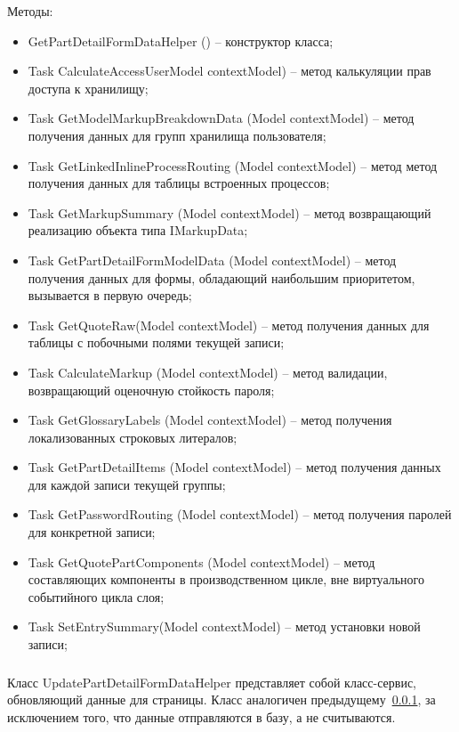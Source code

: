 Методы:
\begin{itemize}
  \item GetPartDetailFormDataHelper () – конструктор класса;
  \item Task CalculateAccessUserModel contextModel) – метод калькуляции прав доступа к хранилищу;
  \item Task GetModelMarkupBreakdownData (Model contextModel) – метод получения данных для групп хранилища пользователя;
  \item Task GetLinkedInlineProcessRouting (Model contextModel) – метод метод получения данных для таблицы встроенных процессов;
  \item Task GetMarkupSummary (Model contextModel) – метод возвращающий реализацию объекта типа IMarkupData;
  \item Task GetPartDetailFormModelData (Model contextModel) – метод получения данных для формы, обладающий наибольшим приоритетом, вызывается в первую очередь;
  \item Task GetQuoteRaw(Model contextModel) – метод получения данных для таблицы с побочными полями текущей записи;
  \item Task CalculateMarkup (Model contextModel) – метод валидации, возвращающий оценочную стойкость пароля;
  \item Task GetGlossaryLabels (Model contextModel) – метод получения локализованных строковых литералов;
  \item Task GetPartDetailItems (Model contextModel) – метод получения данных для каждой записи текущей группы;
  \item Task GetPasswordRouting (Model contextModel) – метод получения паролей для конкретной записи;
  \item Task GetQuotePartComponents (Model contextModel) – метод составляющих компоненты в производственном цикле, вне виртуального событийного цикла слоя;
  \item Task SetEntrySummary(Model contextModel) – метод установки новой записи;
\end{itemize}

\subsubsection{}
\label{sub:arch_and_mod:data_layer:view_part_detail}

Класс UpdatePartDetailFormDataHelper представляет собой класс-сервис, обновляющий данные для страницы. Класс аналогичен предыдущему~\ref{sub:arch_and_mod:data_layer:view_part_detail}, за исключением того, что данные отправляются в базу, а не считываются.


